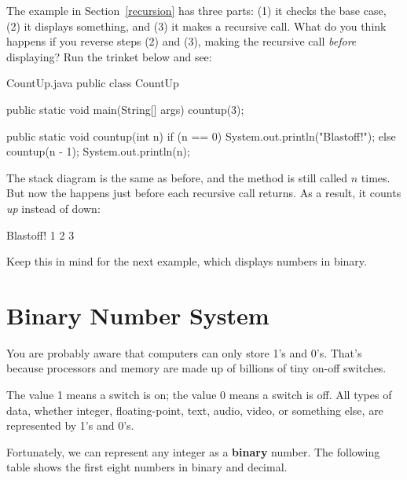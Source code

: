 The  example in Section~\ref{recursion} has three parts: (1) it checks the base case, (2) it displays something, and (3) it makes a recursive call.
What do you think happens if you reverse steps (2) and (3), making the recursive call {\em before} displaying?  Run the trinket below and see:

\begin{trinket} [280] {CountUp.java}
public class CountUp {

    public static void main(String[] args) {
       countup(3);
    }
    
    public static void countup(int n) {
        if (n == 0) {
            System.out.println("Blastoff!");
        } else {
            countup(n - 1);
            System.out.println(n);
        }
    }
}
\end{trinket}


The stack diagram is the same as before, and the method is still called $n$ times.
But now the  happens just before each recursive call returns.
As a result, it counts {\em up} instead of down:

\begin{stdout}
Blastoff!
1
2
3
\end{stdout}

Keep this in mind for the next example, which displays numbers in binary.

\section{Binary Number System}
\label{binary}

You are probably aware that computers can only store 1's and 0's.
That's because processors and memory are made up of billions of tiny on-off switches.

The value 1 means a switch is on; the value 0 means a switch is off.
All types of data, whether integer, floating-point, text, audio, video, or something else, are represented by 1's and 0's.


Fortunately, we can represent any integer as a {\bf binary} number.
The following table shows the first eight numbers in binary and decimal.

